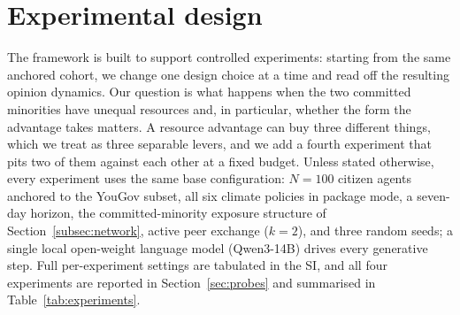 \documentclass[pdflatex,sn-mathphys-num]{sn-jnl}%
\theoremstyle{thmstyleone}%
\theoremstyle{thmstyletwo}%
\theoremstyle{thmstylethree}%
\begin{document}



\section{Experimental design}\label{sec:levers}

The framework is built to support controlled experiments: starting from the same anchored
cohort, we change one design choice at a time and read off the resulting opinion
dynamics. Our question is what happens when the two committed minorities have unequal
resources and, in particular, whether the form the advantage takes matters. A resource
advantage can buy three different things, which we treat as three separable levers, and
we add a fourth experiment that pits two of them against each other at a fixed budget.
Unless stated otherwise, every experiment uses the same base configuration: $N=100$
citizen agents anchored to the YouGov subset, all six climate policies in package mode, a
seven-day horizon, the committed-minority exposure structure of
Section~\ref{subsec:network}, active peer exchange ($k=2$), and three random seeds; a
single local open-weight language model (Qwen3-14B) drives every generative step. Full
per-experiment settings are tabulated in the SI, and all four experiments are reported in
Section~\ref{sec:probes} and summarised in Table~\ref{tab:experiments}.
\end{document}
